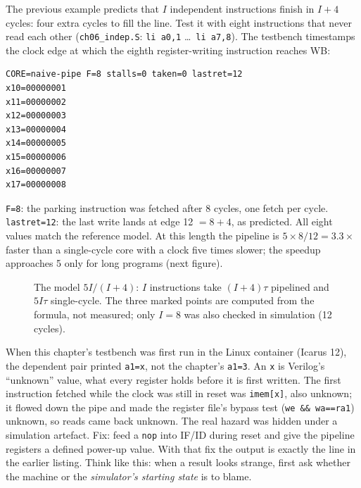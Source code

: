 \begin{example}\label{ex:fillmeas06}
The previous example predicts that $I$ independent instructions
finish in $I+4$ cycles: four extra cycles to fill the line. Test it
with eight instructions that never read each other
(\texttt{ch06\_indep.S}: \texttt{li a0,1} \dots\ \texttt{li a7,8}).
The testbench timestamps the clock edge at which the eighth
register-writing instruction reaches WB:
\begin{lstlisting}
CORE=naive-pipe F=8 stalls=0 taken=0 lastret=12
x10=00000001
x11=00000002
x12=00000003
x13=00000004
x14=00000005
x15=00000006
x16=00000007
x17=00000008
\end{lstlisting}
\texttt{F=8}: the parking instruction was fetched after
8 cycles, one fetch per cycle. \texttt{lastret=12}: the last write lands
at edge 12 $=8+4$, as predicted. All eight values match the reference
model. At this length the pipeline is $5\times8/12=3.3\times$ faster
than a single-cycle core with a clock five times slower; the speedup
approaches 5 only for long programs (next figure).
\end{example}

\begin{figure}[t]
\centering

\caption[Speedup versus program length]{The model $5I/(I+4)$:
$I$ instructions take $(I+4)\tau$ pipelined and $5I\tau$ single-cycle.
The three marked points are computed from the formula, not measured;
only $I=8$ was also checked in simulation (12 cycles).}
\label{fig:speedup06}
\end{figure}

\begin{example}\label{ex:xprop06}
When this chapter's testbench was first run in the Linux container
(Icarus 12), the dependent pair printed \texttt{a1=x}, not the
chapter's \texttt{a1=3}. An \texttt{x} is Verilog's ``unknown'' value,
what every register holds before it is first written. The first
instruction fetched while the clock was still in reset was
\texttt{imem[x]}, also unknown; it flowed down the pipe and made the
register file's bypass test (\texttt{we \&\& wa==ra1}) unknown, so
reads came back unknown. The real hazard was hidden under a
simulation artefact. Fix: feed a \texttt{nop} into IF/ID during reset
and give the pipeline registers a defined power-up value. With that
fix the output is exactly the line in the earlier listing. Think like
this: when a result looks strange, first ask whether the machine or the
\emph{simulator's starting state} is to blame.
\end{example}

